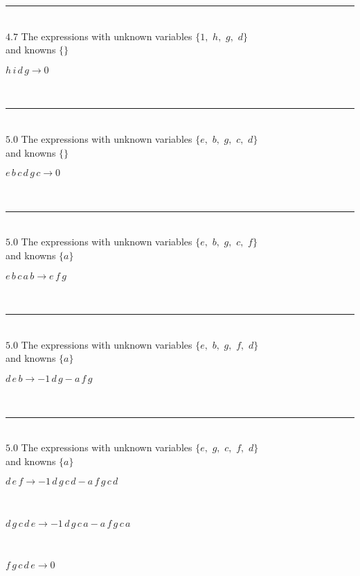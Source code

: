 \documentclass[rep10,leqno]{report}
\begin{document}
\rule[3pt]{6in}{.7pt}\\
$4.7$  The expressions with unknown variables $\{1,
$ $
h,
$ $
g,
$ $
d\}$\\
and knowns $\{\}$\smallskip\\
\begin{minipage}{6in}
$
h\,
 i\,
 d\,
 g\rightarrow 0
$
\end{minipage}\\
\rule[3pt]{6in}{.7pt}\\
$5.0$  The expressions with unknown variables $\{e,
$ $
b,
$ $
g,
$ $
c,
$ $
d\}$\\
and knowns $\{\}$\smallskip\\
\begin{minipage}{6in}
$
e\,
 b\,
 c\,
 d\,
 g\,
 c\rightarrow 0
$
\end{minipage}\\
\rule[3pt]{6in}{.7pt}\\
$5.0$  The expressions with unknown variables $\{e,
$ $
b,
$ $
g,
$ $
c,
$ $
f\}$\\
and knowns $\{a\}$\smallskip\\
\begin{minipage}{6in}
$
e\,
 b\,
 c\,
 a\,
 b\rightarrow e\,
 f\,
 g
$
\end{minipage}\\
\rule[3pt]{6in}{.7pt}\\
$5.0$  The expressions with unknown variables $\{e,
$ $
b,
$ $
g,
$ $
f,
$ $
d\}$\\
and knowns $\{a\}$\smallskip\\
\begin{minipage}{6in}
$
d\,
 e\,
 b\rightarrow -1\,
 d\,
 g - a\,
 f\,
 g
$
\end{minipage}\\
\rule[3pt]{6in}{.7pt}\\
$5.0$  The expressions with unknown variables $\{e,
$ $
g,
$ $
c,
$ $
f,
$ $
d\}$\\
and knowns $\{a\}$\smallskip\\
\begin{minipage}{6in}
$
d\,
 e\,
 f\rightarrow -1\,
 d\,
 g\,
 c\,
 d - a\,
 f\,
 g\,
 c\,
 d
$
\end{minipage}\medskip \\
\begin{minipage}{6in}
$
d\,
 g\,
 c\,
 d\,
 e\rightarrow -1\,
 d\,
 g\,
 c\,
 a - a\,
 f\,
 g\,
 c\,
 a
$
\end{minipage}\medskip \\
\begin{minipage}{6in}
$
f\,
 g\,
 c\,
 d\,
 e\rightarrow 0
$
\end{minipage}\\
\end{document}
